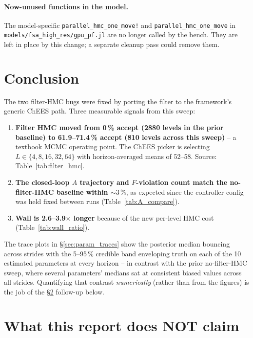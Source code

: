 \documentclass[11pt,a4paper]{article}
\begin{document}
\paragraph{Now-unused functions in the model.} The model-specific
\texttt{parallel\_hmc\_one\_move!} and
\texttt{parallel\_hmc\_one\_move} in
\texttt{models/fsa\_high\_res/gpu\_pf.jl} are no longer called by
the bench. They are left in place by this change; a separate
cleanup pass could remove them.


\section{Conclusion}
\label{sec:conclusion}

The two filter-HMC bugs were fixed by porting the filter to the
framework's generic ChEES path. Three measurable signals from this
sweep:

\begin{enumerate}[itemsep=2pt]
  \item \textbf{Filter HMC moved from 0\,\% accept (2880 levels in
        the prior baseline) to 61.9--71.4\,\% accept (810 levels
        across this sweep)} -- a textbook MCMC operating point. The
        ChEES picker is selecting $L \in \{4, 8, 16, 32, 64\}$
        with horizon-averaged means of 52--58. Source:
        Table~\ref{tab:filter_hmc}.
  \item \textbf{The closed-loop $A$ trajectory and $F$-violation
        count match the no-filter-HMC baseline within $\sim 3\,\%$},
        as expected since the controller config was held fixed
        between runs (Table~\ref{tab:A_compare}).
  \item \textbf{Wall is 2.6--3.9$\times$ longer} because of the
        new per-level HMC cost (Table~\ref{tab:wall_ratio}).
\end{enumerate}

The trace plots in \S\ref{sec:param_traces} show the posterior
median bouncing across strides with the 5--95\,\% credible band
enveloping truth on each of the 10 estimated parameters at every
horizon -- in contrast with the prior no-filter-HMC sweep, where
several parameters' medians sat at consistent biased values across
all strides. Quantifying that contrast \emph{numerically} (rather
than from the figures) is the job of the \S\ref{sec:not_claimed}
follow-up below.


\section{What this report does NOT claim}
\label{sec:not_claimed}
\end{document}
